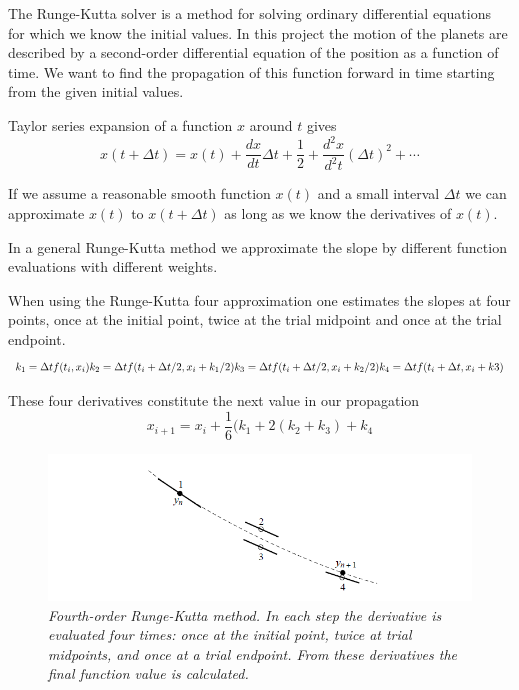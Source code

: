 \documentclass[a4paper,12pt, english]{article}
\begin{document}
The Runge-Kutta solver is a method for solving ordinary differential equations for which we know the initial values. In this project the motion of the planets are described by a second-order differential equation of the position as a function of time. We want to find the propagation of this function forward in time starting from the given initial values. 

Taylor series expansion of a function $x$ around $t$ gives
$$ x(t+ \Delta t) = x(t) + \frac{dx}{dt} \Delta t + \frac{1}{2} + \frac{d^2 x}{d^2 t} (\Delta t)^2 + \cdots $$

If we assume a reasonable smooth function $x(t)$ and a small interval $\Delta t$ we can approximate $x(t)$ to $x(t + \Delta t)$ as long as we know the derivatives of $x(t)$. 

In a general Runge-Kutta method we approximate the slope by different function evaluations with different weights.

When using the Runge-Kutta four approximation one estimates the slopes at four points, once at the initial point, twice at the trial midpoint and once at the trial endpoint. 
$$ k_1 = \Delta t f(t_i,x_i) \\
k_2 = \Delta t f(t_i + \Delta t /2, x_i + k_1/2) \\
k_3 = \Delta t f(t_i + \Delta t/2, x_i + k_2/2) \\
k_4 = \Delta t f(t_i + \Delta t, x_i + k3) $$

These four derivatives constitute the next value in our propagation
$$x_{i+1} = x_i + \frac{1}{6} (k_1 + 2(k_2+k_3) + k_4$$ 
  
\begin{figure}[h!]
  \centering    \includegraphics[scale=0.5]{rk4.png}
  \caption{\textit{Fourth-order Runge-Kutta method. In each step the derivative is evaluated four times:
once at the initial point, twice at trial midpoints, and once at a trial endpoint. From these derivatives the
final function value is calculated. }}
\end{figure}
\end{document}
